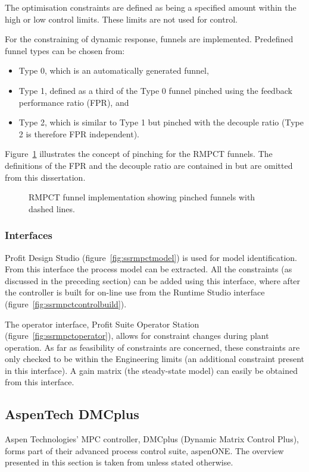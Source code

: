 The optimisation constraints are defined as being a specified amount within the high or low control limits.
These limits are not used for control.

For the constraining of dynamic response, funnels are implemented.
Predefined funnel types can be chosen from:
\begin{itemize}
\item Type 0, which is an automatically generated funnel,
\item Type 1, defined as a third of the Type 0 funnel pinched using the feedback performance ratio (FPR), and
\item Type 2, which is similar to Type 1 but pinched with the decouple ratio (Type 2 is therefore FPR independent).
\end{itemize}
Figure~\ref{fig:rmpctfunnel} illustrates the concept of pinching for the RMPCT funnels.
The definitions of the FPR and the decouple ratio are contained in \citet{honeywell1} but are omitted from this dissertation.
\begin{figure}[htbp]
  \centering
  \scalebox{1}{}  
  \caption[RMPCT funnel implementation]{RMPCT funnel implementation showing pinched funnels with dashed lines.}
  \label{fig:rmpctfunnel}
\end{figure}

\subsubsection{Interfaces}
Profit Design Studio (figure~\ref{fig:ssrmpctmodel}) is used for model identification.
From this interface the process model can be extracted.
All the constraints (as discussed in the preceding section) can be added using this interface, where after the controller is built for on-line use from the Runtime Studio interface (figure~\ref{fig:ssrmpctcontrolbuild}).

The operator interface, Profit Suite Operator Station (figure~\ref{fig:ssrmpctoperator}), allows for constraint changes during plant operation.
As far as feasibility of constraints are concerned, these constraints are only checked to be within the Engineering limits (an additional constraint present in this interface).
A gain matrix (the steady-state model) can easily be obtained from this interface.

\subsection{AspenTech DMCplus}
Aspen Technologies' MPC controller, DMCplus (Dynamic Matrix Control Plus), forms part of their advanced process control suite, aspenONE.
The overview presented in this section is taken from \citet{aspentech1} unless stated otherwise.

